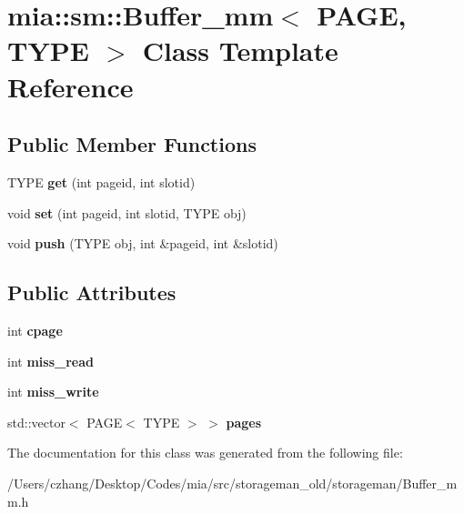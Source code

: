 \hypertarget{classmia_1_1sm_1_1_buffer__mm}{\section{mia\-:\-:sm\-:\-:Buffer\-\_\-mm$<$ P\-A\-G\-E, T\-Y\-P\-E $>$ Class Template Reference}
\label{classmia_1_1sm_1_1_buffer__mm}
}
\subsection*{Public Member Functions}
\begin{DoxyCompactItemize}
\item 
\hypertarget{classmia_1_1sm_1_1_buffer__mm_a1679c5089078fc73b6aa33b1817cf0ca}{T\-Y\-P\-E {\bfseries get} (int pageid, int slotid)}\label{classmia_1_1sm_1_1_buffer__mm_a1679c5089078fc73b6aa33b1817cf0ca}

\item 
\hypertarget{classmia_1_1sm_1_1_buffer__mm_a23322e755d5d8f61b60fbb97243658ff}{void {\bfseries set} (int pageid, int slotid, T\-Y\-P\-E obj)}\label{classmia_1_1sm_1_1_buffer__mm_a23322e755d5d8f61b60fbb97243658ff}

\item 
\hypertarget{classmia_1_1sm_1_1_buffer__mm_ad4cb43214f27c955b9a9be4903adf951}{void {\bfseries push} (T\-Y\-P\-E obj, int \&pageid, int \&slotid)}\label{classmia_1_1sm_1_1_buffer__mm_ad4cb43214f27c955b9a9be4903adf951}

\end{DoxyCompactItemize}
\subsection*{Public Attributes}
\begin{DoxyCompactItemize}
\item 
\hypertarget{classmia_1_1sm_1_1_buffer__mm_a2cdd9bd381e34e5a27b546133ea0c089}{int {\bfseries cpage}}\label{classmia_1_1sm_1_1_buffer__mm_a2cdd9bd381e34e5a27b546133ea0c089}

\item 
\hypertarget{classmia_1_1sm_1_1_buffer__mm_ac4c2a6a85efca2365dc11d99beb731ff}{int {\bfseries miss\-\_\-read}}\label{classmia_1_1sm_1_1_buffer__mm_ac4c2a6a85efca2365dc11d99beb731ff}

\item 
\hypertarget{classmia_1_1sm_1_1_buffer__mm_a7a095f928a1c8fc6760b793ae40888f3}{int {\bfseries miss\-\_\-write}}\label{classmia_1_1sm_1_1_buffer__mm_a7a095f928a1c8fc6760b793ae40888f3}

\item 
\hypertarget{classmia_1_1sm_1_1_buffer__mm_ab2dac9275c5cea293d4e62e6cb6f5b75}{std\-::vector$<$ P\-A\-G\-E$<$ T\-Y\-P\-E $>$ $>$ {\bfseries pages}}\label{classmia_1_1sm_1_1_buffer__mm_ab2dac9275c5cea293d4e62e6cb6f5b75}

\end{DoxyCompactItemize}


The documentation for this class was generated from the following file\-:\begin{DoxyCompactItemize}
\item 
/\-Users/czhang/\-Desktop/\-Codes/mia/src/storageman\-\_\-old/storageman/Buffer\-\_\-mm.\-h\end{DoxyCompactItemize}
